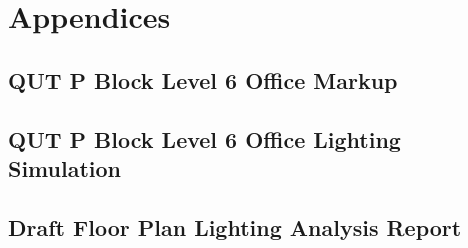 \section{Appendices}

\subsection{QUT P Block Level 6 Office Markup}
\label{appendix:qut_lvl6_markup}


\subsection{QUT P Block Level 6 Office Lighting Simulation}
\label{appendix:QUT-Lvl6-office-rev3}


\subsection{Draft Floor Plan Lighting Analysis Report}
\label{appenddix:DraftFloorPlanLighting}



